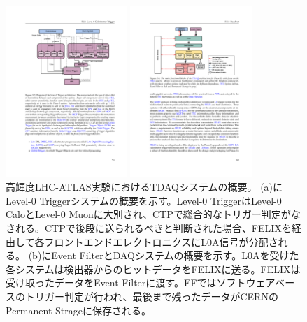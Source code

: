 \begin{figure}
\begin{minipage}[b]{.5\linewidth}
\centering
\includegraphics[height=6.5cm]{fig/Intro/Phase2_L0trigger.pdf}
\end{minipage}%
\begin{minipage}[b]{.5\linewidth}
\centering
\includegraphics[height=6.5cm]{fig/Intro/Phase2_EF.pdf}
\end{minipage}%
\caption[高輝度LHC-ATLAS実験におけるTDAQシステムの概要]{高輝度LHC-ATLAS実験におけるTDAQシステムの概要\cite{tdr_phase2tdaq_2017020}。 (a)にLevel-0 Triggerシステムの概要を示す。Level-0 TriggerはLevel-0 CaloとLevel-0 Muonに大別され、CTPで総合的なトリガー判定がなされる。CTPで後段に送られるべきと判断された場合、FELIXを経由して各フロントエンドエレクトロニクスにL0A信号が分配される。 (b)にEvent FilterとDAQシステムの概要を示す。L0Aを受けた各システムは検出器からのヒットデータをFELIXに送る。FELIXは受け取ったデータをEvent Filterに渡す。EFではソフトウェアベースのトリガー判定が行われ、最後まで残ったデータがCERNのPermanent Strageに保存される。}
\label{Phase2_TDAQ}
\end{figure}

